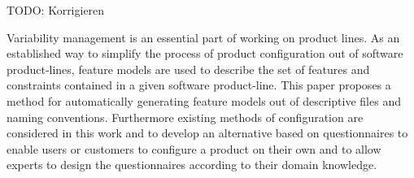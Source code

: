 {\color{red}TODO: Korrigieren}

Variability management is an essential part of working on product lines.
As an established way to simplify the process of product configuration out of software product-lines, feature models are used to describe the set of features and constraints contained in a given software product-line. This paper proposes a method for automatically generating feature models out of descriptive files and naming conventions.
Furthermore existing methods of configuration are considered in this work and to develop an alternative based on questionnaires to enable users or customers to configure a product on their own and to allow experts to design the questionnaires according to their domain knowledge.
